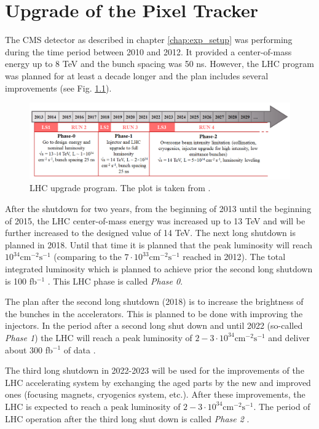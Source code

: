 \chapter{Upgrade of the Pixel Tracker}\label{chapt:pixel}

The CMS detector as described in chapter \ref{chap:exp_setup} was performing during the time period 
between 2010 and 2012. It provided a center-of-mass energy up to 8 TeV and the bunch spacing was 50 ns. 
However, the LHC program was planned for at least a decade longer and the plan includes several improvements
(see Fig. \ref{fig:LHC_sc}).

\begin{figure}[h]
 \centering
 \includegraphics[width=1.0\textwidth]{021_pixel_upgrade/plots/LHC_schedule.png}
 \caption{LHC upgrade program. The plot is taken from \cite{1742-6596-515-1-012012}.}
 \label{fig:LHC_sc}
\end{figure}

After the shutdown for two years, from the beginning of 2013 until the beginning of 2015, the LHC 
center-of-mass energy was increased up to 13 TeV and will be further increased to the designed value
of 14 TeV. The next long shutdown is planned in 2018. Until that time it is planned that the peak
luminosity will reach $10^{34} \text{cm}^{-2} \text{s}^{-1}$ (comparing to the $7 \cdot 10^{33} \text{cm}^{-2}\text{s}^{-1}$
reached in 2012). The total integrated luminosity which is planned to achieve prior the second long shutdown
is 100 fb$^{-1}$ \cite{CMS:2012sda}. This LHC phase is called \textit{Phase 0}.

The plan after the second long shutdown (2018) is to increase the brightness of the bunches
in the accelerators. This is planned to be done with improving the injectors. In the period 
after a second long shut down and until 2022 (so-called \textit{Phase 1}) the LHC will reach
a peak luminosity of $2-3 \cdot 10^{34} \text{cm}^{-2} \text{s}^{-1}$ and deliver about 
300 fb$^{-1}$ of data \cite{Rocca:2014soa}. 

The third long shutdown in 2022-2023 will be used for the improvements of the LHC accelerating system by
exchanging the aged parts by the new and improved ones (focusing magnets, cryogenics system, etc.).
After these improvements, the LHC is expected to reach a peak luminosity of $2-3 \cdot 10^{34} \text{cm}^{-2} \text{s}^{-1}$.
The period of LHC operation after the third long shut down is called \textit{Phase 2} \cite{Rocca:2014soa}.

